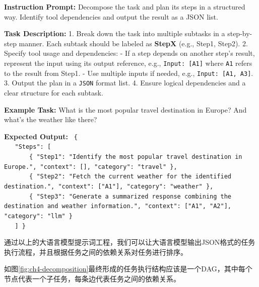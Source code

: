 \begin{center}
\begin{tcolorbox}[colback=bgcolor, colframe=black, width=0.8\textwidth, boxrule=0.5mm, 
coltitle=white, colbacktitle=titlecolor, title=Task Decomposition and Response Planning with GPT-4]


\textbf{Instruction Prompt:} Decompose the task and plan its steps in a structured way. Identify tool dependencies and output the result as a JSON list.

\textbf{Task Description:}  
1. Break down the task into multiple subtasks in a step-by-step manner. Each subtask should be labeled as \textbf{StepX} (e.g., Step1, Step2).  
2. Specify tool usage and dependencies:  
   - If a step depends on another step's result, represent the input using its output reference, e.g., \texttt{Input: [A1]} where \texttt{A1} refers to the result from Step1.  
   - Use multiple inputs if needed, e.g., \texttt{Input: [A1, A3]}.  
3. Output the plan in a \texttt{JSON} format list.  
4. Ensure logical dependencies and a clear structure for each subtask. 

\textbf{Example Task:}  
What is the most popular travel destination in Europe? And what’s the weather like there?

\textbf{Expected Output:}  
\texttt{%
\{ \\
\ \ \ "Steps": [ \\
\ \ \ \ \ \ \ \{ "Step1": "Identify the most popular travel destination in Europe.", "context": [], "category": "travel" \}, \\
\ \ \ \ \ \ \ \{ "Step2": "Fetch the current weather for the identified destination.", "context": ["A1"], "category": "weather" \}, \\
\ \ \ \ \ \ \ \{ "Step3": "Generate a summarized response combining the destination and weather information.", "context": ["A1", "A2"], "category": "llm" \} \\
\ \ \ ]
\}
}

\end{tcolorbox}
\end{center}

通过以上的大语言模型提示词工程，我们可以让大语言模型输出JSON格式的任务执行流程，并且根据任务之间的依赖关系对任务进行排序。

如图\ref{fig:ch4-decomposition}最终形成的任务执行结构应该是一个DAG，其中每个节点代表一个子任务，每条边代表任务之间的依赖关系。

